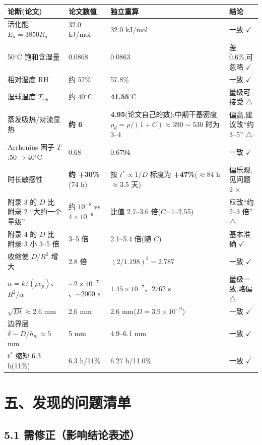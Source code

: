 \documentclass[12pt,a4paper]{ctexart}
\newcommand{\ok}{$\checkmark$}
\newcommand{\warn}{$\triangle$}
\newcommand{\fix}{$\times$}
\newcommand{\dg}{\ensuremath{^\circ}}
\begin{document}
\begin{center}
{\begin{tabular}{p{5.2cm}p{2.6cm}p{2.6cm}p{2.4cm}}
\toprule
论断(论文) & 论文数值 & 独立重算 & 结论 \\
\midrule
活化能 $E_a=3850R_g$ & 32.0 kJ/mol & 32.0 kJ/mol & 一致 \ok \\
50\dg C 饱和含湿量 & 0.0868 & 0.0863 & 差 0.6\%,可忽略 \ok \\
相对湿度 RH & 约 57\% & 57.8\% & 一致 \ok \\
湿球温度 $T_{wb}$ & 约 $40\dg$C & \textbf{41.55}\dg C & 量级可接受 \warn \\
蒸发吸热/对流显热 & \textbf{约 6} & \textbf{4.95}(论文自己的数);中期干基密度 $\rho_d=\rho/(1+C)\approx390\sim530$ 时为 3--4 & 偏高,建议改``约 3--5'' \warn \\
Arrhenius 因子 $T$:50$\to$40\dg C & 0.68 & 0.6794 & 一致 \ok \\
时长敏感性 & \textbf{约 +30\%}(74 h) & 按 $t^*\propto1/D$ 标度为 \textbf{+47\%}($\approx$84 h$\approx$3.5 天) & 偏乐观,见问题 2 \fix \\
附录 3 的 $D$ 比附录 2 ``大约一个量级'' & 约 $10^{-8}$ vs $4\times10^{-9}$ & 比值 2.7--3.6 倍($C$=1--2.55) & 应改``约 2--3 倍'' \warn \\
附录 4 的 $D$ 比附录 3 小 3--5 倍 & 3--5 倍 & 2.1--5.4 倍(随 $C$) & 基本准确 \ok \\
收缩使 $D/R^2$ 增大 & 2.8 倍 & $(2/1.198)^2=2.787$ & 一致 \ok \\
$\alpha=k/(\rho c_p)$、$R^2/\alpha$ & $\sim2\times10^{-7}$、$\sim2000$ s & $1.45\times10^{-7}$、2762 s & 量级一致,略偏 \warn \\
$\sqrt{Dt}\approx2.6$ mm & 2.6 mm & 2.6 mm($D=3.9\times10^{-9}$) & 一致 \ok \\
边界层 $\delta\sim D/h_m\approx5$ mm & 5 mm & 4.9--6.1 mm & 一致 \ok \\
$t^*$ 缩短 6.3 h(11\%) & 6.3 h/11\% & 6.27 h/11.0\% & 一致 \ok \\
\bottomrule
\end{tabular}}
\end{center}

\section{五、发现的问题清单}

\subsection{5.1 需修正（影响结论表述）}
\end{document}
